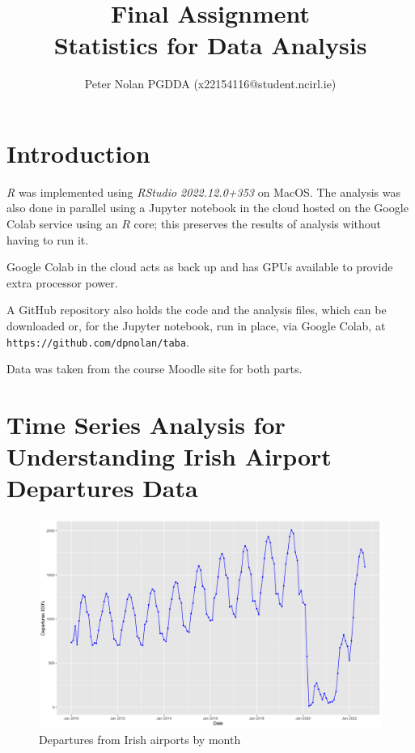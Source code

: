 \documentclass[9pt,technote]{IEEEtran}
\begin{document}
\title{Final Assignment\\ Statistics for Data Analysis}
\author{Peter Nolan PGDDA (x22154116@student.ncirl.ie)}
\maketitle

\section{Introduction}

\textit{R} was implemented using \textit{RStudio 2022.12.0+353} on MacOS.  The analysis was also done in parallel using a Jupyter notebook in the cloud hosted on the Google Colab service using an $R$ core; this preserves the results of analysis without having to run it.  

Google Colab in the cloud acts as back up and has GPUs available to provide extra processor power.  

A GitHub repository also holds the code and the analysis files, which can be downloaded or, for the Jupyter notebook, run in place, via Google Colab, at \texttt{https://github.com/dpnolan/taba}.  

Data was taken from the course Moodle site for both parts.  

\section{Time Series Analysis for Understanding Irish Airport Departures Data}

\begin{figure}
    \centering
    \includegraphics[width=1\textwidth]{ts_departs.png}
    \caption{Departures from Irish airports by month}
    \label{fig:ts_departs}
\end{figure}
\end{document}
